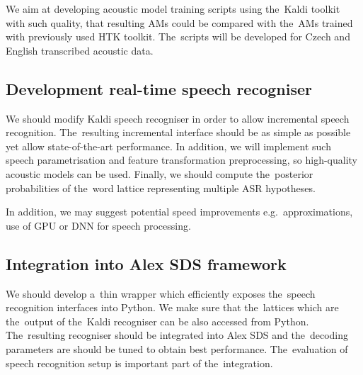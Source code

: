 We aim at developing acoustic model training scripts using the~Kaldi toolkit with such quality, that resulting \acp{AM} could be compared with the~\acp{AM} trained with previously used \ac{HTK} toolkit. 
The~scripts will be developed for Czech and English transcribed acoustic data.

\subsection{Development real-time speech recogniser} 
\label{sub:compare_rt}

We should modify Kaldi speech recogniser in order to allow incremental speech recognition.
The~resulting incremental interface should be as simple as possible yet allow state-of-the-art performance.
In addition, we will implement such speech parametrisation and feature transformation preprocessing, so high-quality acoustic models can be used.
Finally, we should compute the~posterior probabilities of the~word lattice representing multiple \ac{ASR} hypotheses.


In addition, we may suggest potential speed improvements e.g.\ approximations, use of \ac{GPU} or \ac{DNN} for speech processing\cite{vesely2013sequencediscriminative}.

\subsection[Integration into Alex \acs{SDS} framework]{Integration into Alex \acl{SDS} framework} 
\label{sub:integration}
We should develop a~thin wrapper which efficiently exposes the~speech recognition interfaces into Python.
We make sure that the~lattices which are the~output of the~Kaldi recogniser can be also accessed from Python.
The~resulting recogniser should be integrated into Alex \ac{SDS} and the~decoding parameters are should be tuned to obtain best performance.
The~evaluation of speech recognition setup is important part of the~integration.

